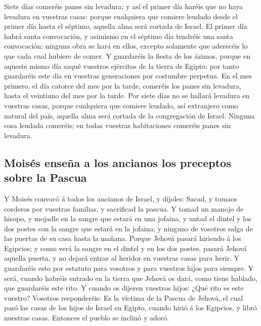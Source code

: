  Siete días comeréis panes sin levadura; y así el primer
día haréis que no haya levadura en vuestras casas: porque cualquiera que
comiere leudado desde el primer día hasta el séptimo, aquella alma será
cortada de Israel.  El primer día habrá santa convocación,
y asimismo en el séptimo día tendréis una santa convocación: ninguna
obra se hará en ellos, excepto solamente que aderecéis lo que cada cual
hubiere de comer.  Y guardaréis la fiesta de los ázimos,
porque en aqueste mismo día saqué vuestros ejércitos de la tierra de
Egipto: por tanto guardaréis este día en vuestras generaciones por
costumbre perpetua.  En el mes primero, el día catorce del
mes por la tarde, comeréis los panes sin levadura, hasta el veintiuno
del mes por la tarde.  Por siete días no se hallará
levadura en vuestras casas, porque cualquiera que comiere leudado, así
extranjero como natural del país, aquella alma será cortada de la
congregación de Israel.  Ninguna cosa leudada comeréis; en
todas vuestras habitaciones comeréis panes sin levadura.

\hypertarget{moisuxe9s-enseuxf1a-a-los-ancianos-los-preceptos-sobre-la-pascua}{%
\subsection{Moisés enseña a los ancianos los preceptos sobre la
Pascua}\label{moisuxe9s-enseuxf1a-a-los-ancianos-los-preceptos-sobre-la-pascua}}

 Y Moisés convocó á todos los ancianos de Israel, y
díjoles: Sacad, y tomaos corderos por vuestras familias, y sacrificad la
pascua.  Y tomad un manojo de hisopo, y mojadle en la
sangre que estará en una jofaina, y untad el dintel y los dos postes con
la sangre que estará en la jofaina; y ninguno de vosotros salga de las
puertas de su casa hasta la mañana.  Porque Jehová pasará
hiriendo á los Egipcios; y como verá la sangre en el dintel y en los dos
postes, pasará Jehová aquella puerta, y no dejará entrar al heridor en
vuestras casas para herir.  Y guardaréis esto por estatuto
para vosotros y para vuestros hijos para siempre.  Y será,
cuando habréis entrado en la tierra que Jehová os dará, como tiene
hablado, que guardaréis este rito.  Y cuando os dijeren
vuestros hijos: ¿Qué rito es este vuestro?  Vosotros
responderéis: Es la víctima de la Pascua de Jehová, el cual pasó las
casas de los hijos de Israel en Egipto, cuando hirió á los Egipcios, y
libró nuestras casas. Entonces el pueblo se inclinó y adoró.

